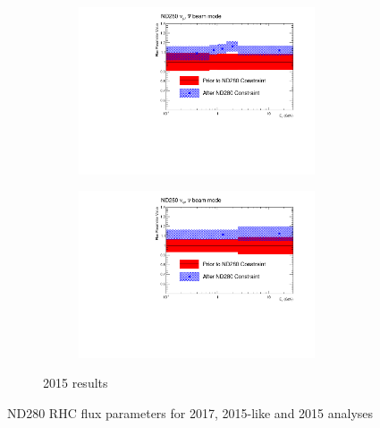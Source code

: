 \begin{figure}[h]
\begin{subfigure}[t]{\textwidth}
\begin{subfigure}[t]{0.24\textwidth}
	\includegraphics[width=\textwidth, trim={0mm 0mm 20mm 0mm}, clip]{figures/official/nd_nf_numu_flux_parms_bias_01}
\end{subfigure}
\begin{subfigure}[t]{0.24\textwidth}
	\includegraphics[width=\textwidth, trim={0mm 0mm 20mm 0mm}, clip]{figures/official/nd_nf_nue_flux_parms_bias_01}
\end{subfigure}
\caption{2015 results}
\end{subfigure}
\caption{ND280 RHC flux parameters for 2017, 2015-like and 2015 analyses}
\label{fig:2015_fluxND280comp_rhc}
\end{figure}

